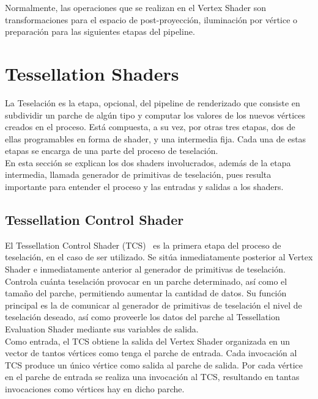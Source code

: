 Normalmente, las operaciones que se realizan en el Vertex Shader son
transformaciones para el espacio de post-proyección, iluminación por vértice o
preparación para las siguientes etapas del pipeline. \\

\section{Tessellation Shaders}
\label{ref:TesShaders}

La Teselación es la etapa, opcional, del pipeline de renderizado que consiste en
subdividir un parche de algún tipo y computar los valores de los nuevos vértices
creados en el proceso. Está compuesta, a su vez, por otras tres etapas, dos de
ellas programables en forma de shader, y una intermedia fija. Cada una de estas
etapas se encarga de una parte del proceso de teselación.\\ 

En esta sección se explican los dos shaders involucrados, además de la etapa
intermedia, llamada generador de primitivas de teselación, pues resulta
importante para entender el proceso y las entradas y salidas a los shaders.\\

\subsection{Tessellation Control Shader}
\label{ref:TesConShader}

El Tessellation Control Shader (TCS)~\cite{TesConShader} es la primera etapa del
proceso de teselación, en el caso de ser utilizado. Se sitúa inmediatamente
posterior al Vertex Shader e inmediatamente anterior al generador de primitivas
de teselación. Controla cuánta teselación provocar en un parche determinado, así
como el tamaño del parche, permitiendo aumentar la cantidad de datos. Su función
principal es la de comunicar al generador de primitivas de teselación el nivel
de teselación deseado, así como proveerle los datos del parche al Tessellation
Evaluation Shader mediante sus variables de salida. \\

Como entrada, el TCS obtiene la salida del Vertex Shader organizada en un vector
de tantos vértices como tenga el parche de entrada. Cada invocación al TCS
produce un único vértice como salida al parche de salida. Por cada vértice en
el parche de entrada se realiza una invocación al TCS, resultando en tantas
invocaciones como vértices hay en dicho parche. \\

